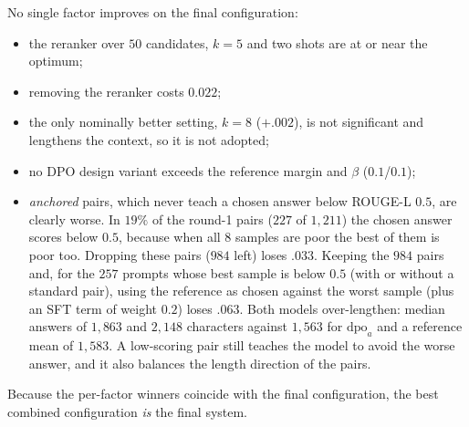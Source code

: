 \documentclass[11pt,a4paper]{article}
\newcommand{\rl}{ROUGE-L}
\begin{document}
No single factor improves on the final configuration:
\begin{itemize}[leftmargin=*]
\item the reranker over $50$ candidates, $k{=}5$ and two shots are at or near the optimum;
\item removing the reranker costs $0.022$;
\item the only nominally better setting, $k{=}8$ ($+.002$), is not significant and lengthens the context, so it is not adopted;
\item no DPO design variant exceeds the reference margin and $\beta$ ($0.1$/$0.1$);
\item \emph{anchored} pairs, which never teach a chosen answer below \rl{} $0.5$, are clearly worse. In $19\%$ of the round-1 pairs ($227$ of $1{,}211$) the chosen answer scores below $0.5$, because when all $8$ samples are poor the best of them is poor too. Dropping these pairs ($984$ left) loses $.033$. Keeping the $984$ pairs and, for the $257$ prompts whose best sample is below $0.5$ (with or without a standard pair), using the reference as chosen against the worst sample (plus an SFT term of weight $0.2$) loses $.063$. Both models over-lengthen: median answers of $1{,}863$ and $2{,}148$ characters against $1{,}563$ for $\mathrm{dpo}_a$ and a reference mean of $1{,}583$. A low-scoring pair still teaches the model to avoid the worse answer, and it also balances the length direction of the pairs.
\end{itemize}
Because the per-factor winners coincide with the final configuration, the best combined configuration \emph{is} the final system.
\end{document}
